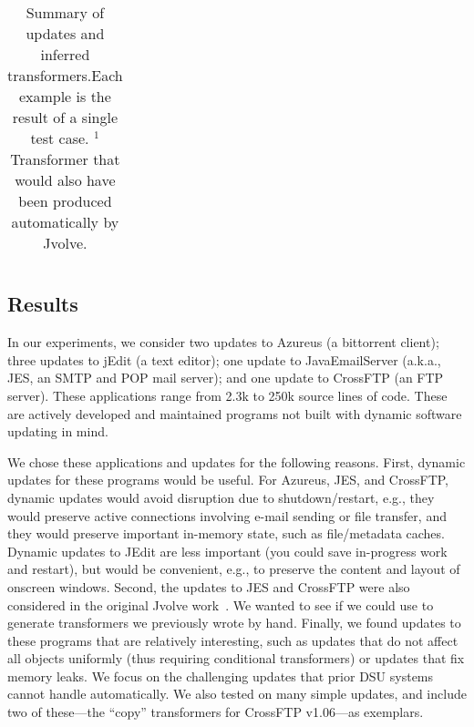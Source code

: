 \begin{table*}[t]
\begin{small}
\begin{center}
\begin{threeparttable}
\begin{tabular}{@{}lrlrrrrlrrr@{}}
\end{tabular}
\caption{Summary of updates and inferred transformers.\label{tab:evaluation} Each example is the result of a single test case. ${}^1$Transformer that would also have been produced automatically by Jvolve.}
\end{threeparttable}
\end{center}
\end{small}
\vspace*{-1em}
\end{table*}

\subsection{Results}

In our experiments, we consider two updates to Azureus (a bittorrent client); three updates to jEdit 
(a text editor); one update  to JavaEmailServer (a.k.a., JES, an SMTP and
POP mail server); and one update to CrossFTP (an FTP server).  These
applications range from 2.3k to 250k source lines of code. These are
actively developed and maintained programs not built with dynamic
software updating in mind.

We chose these applications and updates for the following reasons.
First, dynamic updates for these programs would be useful.  For
Azureus, JES, and CrossFTP, dynamic updates would avoid disruption due
to shutdown/restart, e.g., they would preserve active connections
involving e-mail sending or file transfer, and they would preserve
important in-memory state, such as file/metadata caches.  Dynamic
updates to JEdit are less important (you could save in-progress work
and restart), but would be convenient, e.g., to preserve the content
and layout of
onscreen windows.  Second, the updates to JES and CrossFTP were also
considered in the original Jvolve work~\cite{jvolve}.  We wanted to
see if we could use \TOS to generate transformers we previously
wrote by hand. Finally, we found updates to these programs that are
relatively interesting, such as updates that do not affect all objects
uniformly (thus requiring conditional transformers) or updates that
fix memory leaks.  We focus on the challenging updates that
prior DSU systems cannot handle automatically. We also tested \TOS 
on many simple updates, and include two of these---the ``copy'' transformers
for CrossFTP v1.06---as exemplars.

